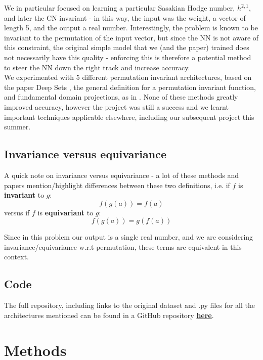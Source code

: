 \documentclass{article}
\begin{document}
We in particular focused on learning a particular Sasakian Hodge number, $h^{2,1}$, and later the CN invariant - in this way, the input was the weight, a vector of length 5, and the output a real number. Interestingly, the problem is known to be invariant to the permutation of the input vector, but since the NN is not aware of this constraint, the original simple model that we (and the paper) trained does not necessarily have this quality - enforcing this is therefore a potential method to steer the NN down the right track and increase accuracy.\\

We experimented with 5 different permutation invariant architectures, based on the paper Deep Sets \cite{zaheer2018deepsets}, the general definition for a permutation invariant function, and fundamental domain projections, as in \cite{aslan2022groupinvariantmachinelearning}. None of these methods greatly improved accuracy, however the project was still a success and we learnt important techniques applicable elsewhere, including our subsequent project this summer. \\

\subsection{Invariance versus equivariance}

A quick note on invariance versus equivariance - a lot of these methods and papers mention/highlight differences between these two definitions, i.e. if $f$ is \textbf{invariant} to $g$:
$$f\left(g\left(a\right)\right) = f\left(a\right)$$
\indent versus if $f$ is \textbf{equivariant} to $g$:
$$f\left(g\left(a\right)\right) = g\left(f\left(a\right)\right)$$

\noindent Since in this problem our output is a single real number, and we are considering invariance/equivariance w.r.t permutation, these terms are equivalent in this context.

\subsection{Code}
The full repository, including links to the original dataset and .py files for all the architectures mentioned can be found in a GitHub repository \href{https://github.com/mdh959/Imperial_projects2024}{\textbf{here}}.

\newpage

\section{Methods}
\end{document}
